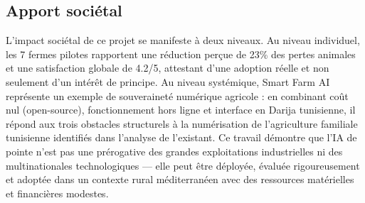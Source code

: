 \subsection*{Apport sociétal}
L'impact sociétal de ce projet se manifeste à deux niveaux. Au niveau
individuel, les 7 fermes pilotes rapportent une réduction perçue de 23\%
des pertes animales et une satisfaction globale de 4.2/5, attestant d'une
adoption réelle et non seulement d'un intérêt de principe. Au niveau systémique,
Smart Farm AI représente un exemple de souveraineté numérique agricole :
en combinant coût nul (open-source), fonctionnement hors ligne et interface
en Darija tunisienne, il répond aux trois obstacles structurels à la
numérisation de l'agriculture familiale tunisienne identifiés dans l'analyse
de l'existant. Ce travail démontre que l'IA de pointe n'est pas une prérogative
des grandes exploitations industrielles ni des multinationales technologiques —
elle peut être déployée, évaluée rigoureusement et adoptée dans un contexte
rural méditerranéen avec des ressources matérielles et financières modestes.

